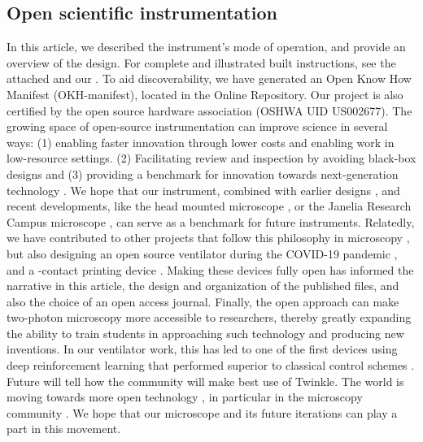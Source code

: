 \documentclass[10pt,letterpaper]{article}
\begin{document}
\subsection*{Open scientific instrumentation}
In this article, we described the instrument's mode of operation, and provide an overview of the design. For complete and illustrated built instructions, see the attached  and our . To aid discoverability, we have generated an Open Know How Manifest (OKH-manifest), located in the Online Repository. Our project is also certified by the open source hardware association (OSHWA UID US002677).\newline
The growing space of open-source instrumentation can improve science in several ways: (1) enabling faster innovation through lower costs and enabling work in low-resource settings. (2) Facilitating review and inspection by avoiding black-box designs and (3) providing a benchmark for innovation towards next-generation technology \cite{Lees2024}. We hope that our instrument, combined with earlier designs \cite{Rosenegger2014, Mayrhofer2015, Tan1999}, and recent developments, like the head mounted microscope \cite{Zong2022}, or the Janelia Research Campus microscope \cite{Janelia2024}, can serve as a benchmark for future instruments. Relatedly, we have contributed to other projects that follow this philosophy in microscopy \cite{Scott2018}, but also designing an open source ventilator during the COVID-19 pandemic \cite{LaChance2022,POVMC2022}, and a \textmu-contact printing device \cite{Samhaber2016}. Making these devices fully open has informed the narrative in this article, the design and organization of the published files, and also the choice of an open access journal. Finally, the open approach can make two-photon microscopy more accessible to researchers, thereby greatly expanding the ability to train students in approaching such technology and producing new inventions. In our ventilator work, this has led to one of the first devices using deep reinforcement learning that performed superior to classical control schemes \cite{Suo2021}. Future will tell how the community will make best use of Twinkle. The world is moving towards more open technology \cite{Schottdorf2024}, in particular in the microscopy community \cite{Hohlbein2022}. We hope that our microscope and its future iterations can play a part in this movement.
\end{document}
